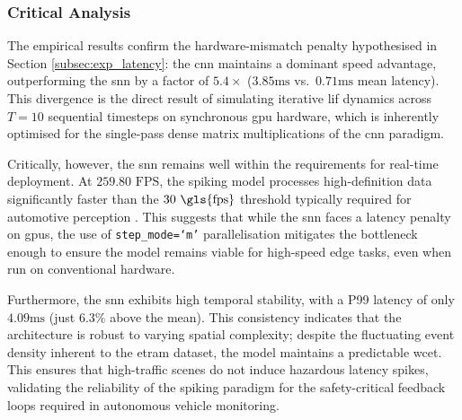 \subsubsection*{Critical Analysis}

The empirical results confirm the hardware-mismatch penalty hypothesised in Section \ref{subsec:exp_latency}: 
the \gls{cnn} maintains a dominant speed advantage, outperforming the \gls{snn} by a factor of $5.4\times$ ($3.85\text{ms}$ vs.\ $0.71\text{ms}$ mean latency). 
This divergence is the direct result of simulating iterative \gls{lif} dynamics across $T=10$ sequential timesteps on synchronous \gls{gpu} hardware, which is inherently optimised for the single-pass dense matrix multiplications of the \gls{cnn} paradigm.

Critically, however, the \gls{snn} remains well within the requirements for real-time deployment. At $259.80\text{ FPS}$, the spiking model processes high-definition data significantly faster than the $30\text{ \gls{fps}}$ threshold typically required for automotive perception \cite{khan2024real}. This suggests that while the \gls{snn} faces a latency penalty on \glspl{gpu}, the use of \texttt{step\_mode=`m'} parallelisation mitigates the bottleneck enough to ensure the model remains viable for high-speed edge tasks, even when run on conventional hardware.

Furthermore, the \gls{snn} exhibits high temporal stability, with a P99 latency of only $4.09\text{ms}$ (just $6.3\%$ above the mean). This consistency indicates that the architecture is robust to varying spatial complexity; despite the fluctuating event density inherent to the \gls{etram} dataset, the model maintains a predictable \gls{wcet}. This ensures that high-traffic scenes do not induce hazardous latency spikes, validating the reliability of the spiking paradigm for the safety-critical feedback loops required in autonomous vehicle monitoring.